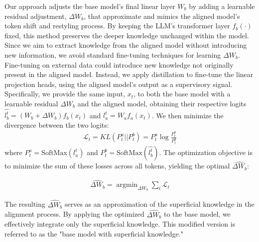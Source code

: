 Our approach adjusts the base model's final linear layer $W_b$ by adding a learnable residual adjustment, $\Delta W_b$, that approximate and mimics the aligned model's token shift and restyling process. By keeping the LLM's transformer layer $f_b(\cdot)$ fixed, this method preserves the deeper knowledge unchanged within the model.
Since we aim to extract knowledge from the aligned model without introducing new information, we avoid standard fine-tuning techniques for learning $\Delta W_b$. Fine-tuning on external data could introduce new knowledge not originally present in the aligned model. Instead, we apply distillation to fine-tune the linear projection heads, using the aligned model's output as a supervisory signal. Specifically, we provide the same input, $x_t$, to both the base model with a learnable residual $\Delta W_b$ and the aligned model, obtaining their respective logits $\widehat{l^t_b} = (W_b + \Delta W_b)f_b(x_t)$ and $l^t_a = W_a f_a(x_t)$. We then minimize the divergence between the two logits:
\begin{align} 
\mathcal{L}_t = KL(P^a_t || P^b_t) = P^a_t \log \frac{P^a_t}{P^b_t} \end{align}
where $P_t^a = \text{SoftMax}(l^t_a)$ and $P_t^b = \text{SoftMax}(\widehat{l^t_b})$.  The optimization objective is to minimize the sum of these losses across all tokens, yielding the optimal $\widehat{\Delta W_b}$:

\begin{align} 
\widehat{\Delta W_b} = \mathop{\arg \min}_{\Delta W_b} \sum_{t} \mathcal{L}_t 
\end{align}

The resulting $\widehat{\Delta W_b}$ serves as an approximation of the superficial knowledge in the alignment process. By applying the optimized $\widehat{\Delta W_b}$ to the base model, we effectively integrate only the superficial knowledge. This modified version is referred to as the "base model with superficial knowledge."


